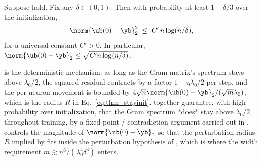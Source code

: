 \begin{lemma}\label{lem:init_residual}
Suppose  hold. Fix any $\delta \in (0, 1)$. Then with probability at least $1 - \delta/3$ over the initialization,
\begin{align*}
\norm{\ub(0) - \yb}_2^2 \;\le\; C' \, n \log(n/\delta),
\end{align*}
for a universal constant $C' > 0$. In particular, $\norm{\ub(0) - \yb}_2 \le \sqrt{C' n \log(n/\delta)}$.
\end{lemma}

 is the deterministic mechanism: as long as the Gram matrix's spectrum stays above $\lambda_0/2$, the squared residual contracts by a factor $1 - \eta \lambda_0/2$ per step, and the per-neuron movement is bounded by $4\sqrt n \norm{\ub(0)-\yb}_2 / (\sqrt m \lambda_0)$, which is the radius $R$ in Eq.~\eqref{eq:thm_stayinit}.  together guarantee, with high probability over initialization, that the Gram spectrum *does* stay above $\lambda_0/2$ throughout training, by a fixed-point / contradiction argument carried out in .  controls the magnitude of $\norm{\ub(0)-\yb}_2$ so that the perturbation radius $R$ implied by  fits inside the perturbation hypothesis of , which is where the width requirement $m \gtrsim n^6 / (\lambda_0^4 \delta^3)$ enters.
